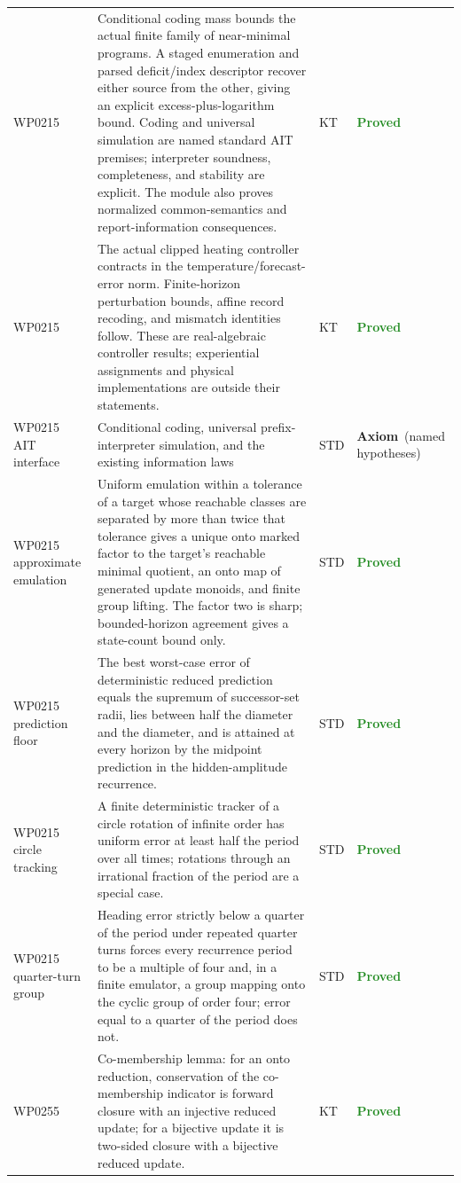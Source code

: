 \documentclass[11pt,a4paper]{article}
\newcommand{\stproved}{\textcolor{ForestGreen}{\textbf{Proved}}}
\newcommand{\staxiom}{\textcolor{bcomblue}{\textbf{Axiom}}}
\begin{document}
{\begin{longtable}{@{}p{2.1cm}p{6.6cm}p{1.0cm}p{2.6cm}@{}}
WP0215 & Conditional coding mass bounds the actual finite family of near-minimal programs. A staged enumeration and parsed deficit/index descriptor recover either source from the other, giving an explicit excess-plus-logarithm bound. Coding and universal simulation are named standard AIT premises; interpreter soundness, completeness, and stability are explicit. The module also proves normalized common-semantics and report-information consequences. & KT & \stproved \\
WP0215 & The actual clipped heating controller contracts in the temperature/forecast-error norm. Finite-horizon perturbation bounds, affine record recoding, and mismatch identities follow. These are real-algebraic controller results; experiential assignments and physical implementations are outside their statements. & KT & \stproved \\
WP0215 AIT interface & Conditional coding, universal prefix-interpreter simulation, and the existing information laws & STD & \staxiom\ (named hypotheses) \\
WP0215 approximate emulation & Uniform emulation within a tolerance of a target whose reachable classes are separated by more than twice that tolerance gives a unique onto marked factor to the target's reachable minimal quotient, an onto map of generated update monoids, and finite group lifting. The factor two is sharp; bounded-horizon agreement gives a state-count bound only. & STD & \stproved \\
WP0215 prediction floor & The best worst-case error of deterministic reduced prediction equals the supremum of successor-set radii, lies between half the diameter and the diameter, and is attained at every horizon by the midpoint prediction in the hidden-amplitude recurrence. & STD & \stproved \\
WP0215 circle tracking & A finite deterministic tracker of a circle rotation of infinite order has uniform error at least half the period over all times; rotations through an irrational fraction of the period are a special case. & STD & \stproved \\
WP0215 quarter-turn group & Heading error strictly below a quarter of the period under repeated quarter turns forces every recurrence period to be a multiple of four and, in a finite emulator, a group mapping onto the cyclic group of order four; error equal to a quarter of the period does not. & STD & \stproved \\
WP0255 & Co-membership lemma: for an onto reduction, conservation of the co-membership indicator is forward closure with an injective reduced update; for a bijective update it is two-sided closure with a bijective reduced update. & KT & \stproved \\

\end{longtable}}
\end{document}
